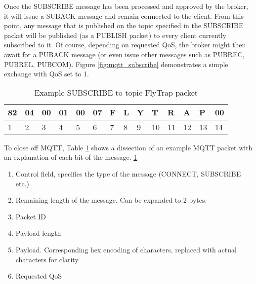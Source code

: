 Once the SUBSCRIBE message has been processed and approved by the broker, it will issue a SUBACK message and remain connected to the client. From this point, any message that is published on the topic specified in the SUBSCRIBE packet will be published (as a PUBLISH packet) to every client currently subscribed to it. Of course, depending on requested QoS, the broker might then await for a PUBACK message (or even issue other messages such as PUBREC, PUBREL, PUBCOM). Figure \ref{fig:mqtt_subscribe} demonstrates a simple exchange with QoS set to 1. 

\begin{table}[]
\centering
\begin{tabular}{llllllllllllll}
\hline
\multicolumn{1}{|l|}{82} & \multicolumn{1}{l|}{04} & \multicolumn{1}{l|}{00} & \multicolumn{1}{l|}{01} & \multicolumn{1}{l|}{00} & \multicolumn{1}{l|}{07} & \multicolumn{1}{l|}{F} & \multicolumn{1}{l|}{L} & \multicolumn{1}{l|}{Y} & \multicolumn{1}{l|}{T} & \multicolumn{1}{l|}{R} & \multicolumn{1}{l|}{A} & \multicolumn{1}{l|}{P} & \multicolumn{1}{l|}{00} \\ \hline
1                        & 2                       & 3                       & 4                       & 5                       & 6                       & 7                      & 8                      & 9                      & 10                     & 11                     & 12                     & 13                     & 14                     
\end{tabular}
\caption{Example SUBSCRIBE to topic FlyTrap packet}
\label{tab:sub_packet}
\end{table}

To close off MQTT, Table \ref{tab:sub_packet} shows a dissection of an example MQTT packet with an explanation of each bit of the message. \ref{tab:sub_packet}
\begin{enumerate}
  \item [1] Control field, specifies the type of the message (CONNECT, SUBSCRIBE etc.)
  \item [2] Remaining length of the message. Can be expanded to 2 bytes.
  \item [3-4] Packet ID
  \item [5-6] Payload length
  \item [7-13] Payload. Corresponding hex encoding of characters, replaced with actual characters for clarity
  \item [14] Requested QoS
\end{enumerate}

